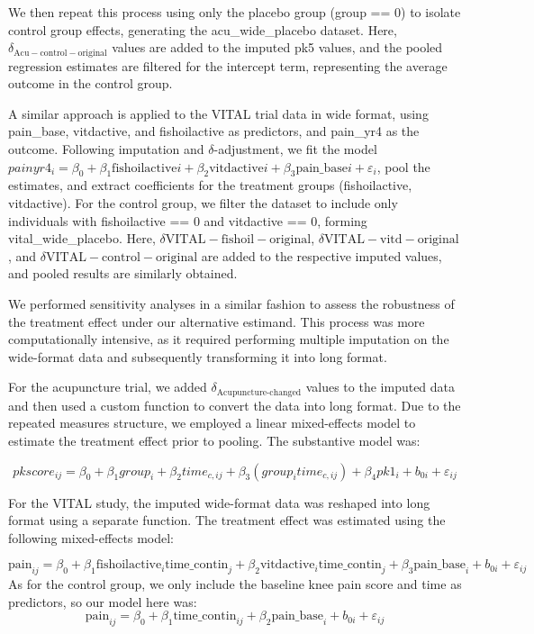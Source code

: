 \documentclass{article}
\begin{document}
We then repeat this process using only the placebo group (group == 0) to
isolate control group effects, generating the acu\_wide\_placebo
dataset. Here, \(\delta_\mathrm{Acu-control-original}\) values are added
to the imputed pk5 values, and the pooled regression estimates are
filtered for the intercept term, representing the average outcome in the
control group.

A similar approach is applied to the VITAL trial data in wide format,
using pain\_base, vitdactive, and fishoilactive as predictors, and
pain\_yr4 as the outcome. Following imputation and
\(\delta\)-adjustment, we fit the model
\(painyr4_i = \beta_0 + \beta_1 \text{fishoilactive}i + \beta_2 \text{vitdactive}i + \beta_3 \text{pain\_base}i + \varepsilon_i\),
pool the estimates, and extract coefficients for the treatment groups
(fishoilactive, vitdactive). For the control group, we filter the
dataset to include only individuals with fishoilactive == 0 and
vitdactive == 0, forming vital\_wide\_placebo. Here,
\(\delta\mathrm{VITAL-fishoil-original}\),
\(\delta\mathrm{VITAL-vitd-original}\), and
\(\delta\mathrm{VITAL-control-original}\) are added to the respective
imputed values, and pooled results are similarly obtained.

We performed sensitivity analyses in a similar fashion to assess the
robustness of the treatment effect under our alternative estimand. This
process was more computationally intensive, as it required performing
multiple imputation on the wide-format data and subsequently
transforming it into long format.

For the acupuncture trial, we added
\(\delta_\mathrm{Acupuncture\text{-}changed}\) values to the imputed
data and then used a custom function to convert the data into long
format. Due to the repeated measures structure, we employed a linear
mixed-effects model to estimate the treatment effect prior to pooling.
The substantive model was:

\[pkscore_{ij} = \beta_0 + \beta_1 group_i + \beta_2 time_{c,ij} + \beta_3 (group_i time_{c,ij}) + \beta_4 pk1_i + b_{0i} + \varepsilon_{ij}\]

For the VITAL study, the imputed wide-format data was reshaped into long
format using a separate function. The treatment effect was estimated
using the following mixed-effects model:

\[\text{pain}_{ij} = \beta_0 
+ \beta_1 \text{fishoilactive}_{i} \text{time\_contin}_{j}
+ \beta_2 \text{vitdactive}_{i} \text{time\_contin}_{j}
+ \beta_3 \text{pain\_base}_{i}
+ b_{0i} + \varepsilon_{ij}\] As for the control group, we only include
the baseline knee pain score and time as predictors, so our model here
was:
\[\text{pain}_{ij} = \beta_0 + \beta_1 \text{time\_contin}_{ij} + \beta_2 \text{pain\_base}_i + b_{0i} + \varepsilon_{ij}\]
\newpage
\end{document}

